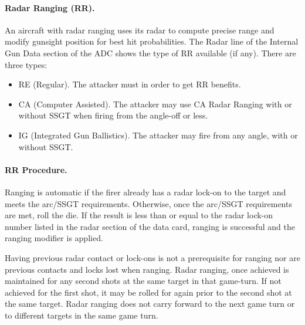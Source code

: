 \begin{advancedrules}
{}




\paragraph{Radar Ranging (RR).} An aircraft with radar ranging uses its radar to compute precise range and modify gunsight position for best hit probabilities. The Radar line of the Internal Gun Data section of the ADC shows the type of RR available (if any). There are three types:

\begin{itemize}

\item RE (Regular). The attacker must  in order to get RR benefits.

\item CA (Computer Assisted). The attacker may use CA Radar Ranging with or without SSGT when firing from the  angle-off or less.

\item IG (Integrated Gun Ballistics). The attacker may fire from any angle, with or without SSGT.

\end{itemize}

\paragraph{RR Procedure.} Ranging is automatic if the firer already has a radar lock-on to the target and meets the arc/SSGT requirements. Otherwise, once the arc/SSGT requirements are met, roll the die. If the result is less than or equal to the radar lock-on number listed in the radar section of the data card, ranging is successful and the ranging modifier is applied.

Having previous radar contact or lock-ons is not a prerequisite for ranging nor are previous contacts and locks lost when ranging. Radar ranging, once achieved is maintained for any second shots at the same target in that game-turn. If not achieved for the first shot, it may be rolled for again prior to the second shot at the same target. Radar ranging does not carry forward to the next game turn or to different targets in the same game turn.


\end{advancedrules}
